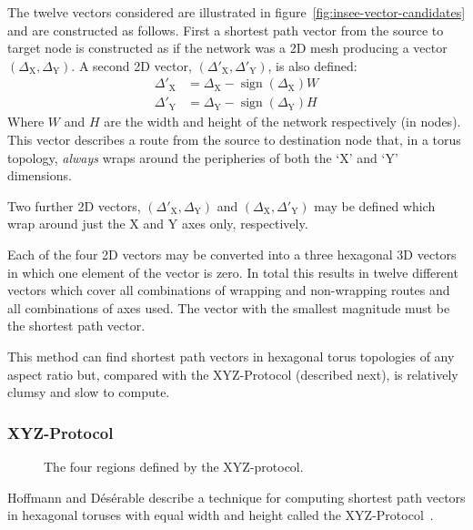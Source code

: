				The twelve vectors considered are illustrated in
				figure~\ref{fig:insee-vector-candidates} and are constructed as
				follows.  First a shortest path vector from the source to target node
				is constructed as if the network was a 2D mesh producing a vector
				$(\Delta_\textrm{X},\Delta_\textrm{Y})$. A second 2D vector,
				$(\Delta'_\textrm{X},\Delta'_\textrm{Y})$, is also defined:
				\begin{align*}
					\Delta'_\textrm{X} &= \Delta_\textrm{X} - \operatorname{sign}(\Delta_\textrm{X})W
					\\
					\Delta'_\textrm{Y} &= \Delta_\textrm{Y} - \operatorname{sign}(\Delta_\textrm{Y})H
				\end{align*}
				Where $W$ and $H$ are the width and height of the network respectively
				(in nodes). This vector describes a route from the source to
				destination node that, in a torus topology, \emph{always} wraps around
				the peripheries of both the `X' and `Y' dimensions.
				
				Two further 2D vectors, $(\Delta'_\textrm{X},\Delta_\textrm{Y})$ and
				$(\Delta_\textrm{X},\Delta'_\textrm{Y})$ may be defined which wrap around
				just the X and Y axes only, respectively.
				
				Each of the four 2D vectors may be converted into a three hexagonal 3D
				vectors in which one element of the vector is zero. In total this
				results in twelve different vectors which cover all combinations of
				wrapping and non-wrapping routes and all combinations of axes used. The
				vector with the smallest magnitude must be the shortest path vector.
				
				This method can find shortest path vectors in hexagonal torus
				topologies of any aspect ratio but, compared with the XYZ-Protocol
				(described next), is relatively clumsy and slow to compute.
			
			\subsubsection{XYZ-Protocol}
				
				\begin{figure}
					\center
					
					\caption{The four regions defined by the XYZ-protocol.}
					\label{fig:xyz-protocol-regions}
				\end{figure}
			
				Hoffmann and D\'es\'erable describe a technique for computing shortest
				path vectors in hexagonal toruses with equal width and height called
				the XYZ-Protocol~\cite{hoffmann15,hoffmann11}.
				
